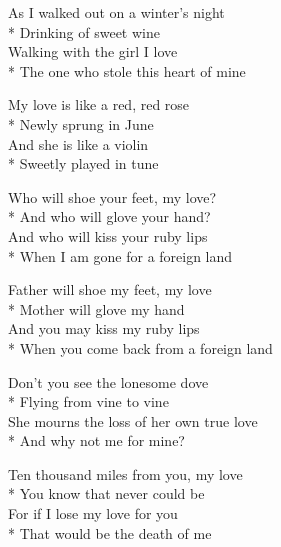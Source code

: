 

\versemark
As I walked out on a winter’s night\\*
Drinking of sweet wine\\
Walking with the girl I love\\*
The one who stole this heart of mine

My love is like a red, red rose\\*
Newly sprung in June\\
And she is like a violin\\*
Sweetly played in tune


\versemark
Who will shoe your feet, my love?\\*
And who will glove your hand?\\
And who will kiss your ruby lips\\*
When I am gone for a foreign land

Father will shoe my feet, my love\\*
Mother will glove my hand\\
And you may kiss my ruby lips\\*
When you come back from a foreign land

\versemark
Don’t you see the lonesome dove\\*
Flying from vine to vine\\
She mourns the loss of her own true love\\*
And why not me for mine?

Ten thousand miles from you, my love\\*
You know that never could be\\
For if I lose my love for you\\*
That would be the death of me \doublerefrain

